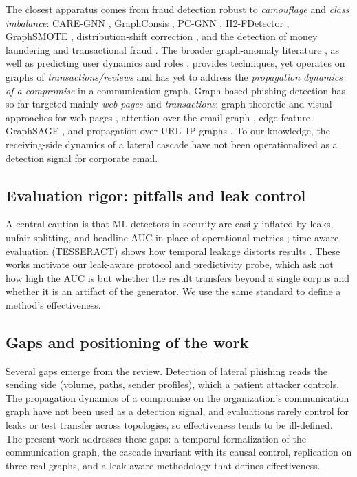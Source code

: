 The closest apparatus comes from fraud detection robust to
\emph{camouflage} and \emph{class imbalance}: CARE-GNN \citep{dou2020enhancing}, GraphConsis \citep{liu2020alleviating},
PC-GNN \citep{liu2021pick}, H2-FDetector \citep{shi2022h2fdetector}, GraphSMOTE \citep{zhao2021graphsmote},
distribution-shift correction \citep{gao2023alleviating,tang2022rethinking}, and the detection of money laundering
and transactional fraud \citep{weber2019antimoney,li2022ttagn,rayana2015collective}. The broader graph-anomaly
literature \citep{ding2019deep,park2020unsupervised,liu2021anomaly,ma2021comprehensive,zhang2021mcgc,li2025umgad}, as well as predicting user dynamics and roles
\citep{kumar2019predicting,wu2020who,li2022pdgnn}, provides techniques, yet operates on graphs of
\emph{transactions/reviews} and has yet to address the \emph{propagation dynamics of a compromise} in a
communication graph. Graph-based phishing detection has so far
targeted mainly \emph{web pages} and \emph{transactions}: graph-theoretic and visual approaches for web pages
\citep{tan2020graph,lin2021phishpedia,abdelnabi2020visualphishnet}, attention over the email graph
\citep{safran2025phishinggnn}, edge-feature GraphSAGE \citep{lo2021egraphsage}, and propagation over URL--IP graphs
\citep{guo2025efficient,li2022pdgnn}. To our knowledge, the receiving-side dynamics of a lateral cascade have
not been operationalized as a detection signal for corporate email.

\subsection{Evaluation rigor: pitfalls and leak control}
\label{sec:rw-eval}
A central caution is that ML detectors in security are easily inflated by leaks, unfair splitting, and headline
AUC in place of operational metrics \citep{arp2022dos}; time-aware evaluation (TESSERACT) shows how temporal
leakage distorts results \citep{pendlebury2019tesseract}. These works motivate our leak-aware protocol and
predictivity probe, which ask not how high the AUC is but whether the result transfers beyond a single corpus and
whether it is an artifact of the generator. We use the same standard to define a method's effectiveness.

\subsection{Gaps and positioning of the work}
\label{sec:rw-gap}
Several gaps emerge from the review. Detection of lateral phishing reads the sending side (volume, paths,
sender profiles), which a patient attacker controls. The propagation dynamics of a compromise on the
organization's communication graph have not been used as a detection signal, and evaluations rarely control for
leaks or test transfer across topologies, so effectiveness tends to be ill-defined. The present work addresses
these gaps: a temporal formalization of the communication graph, the cascade invariant with its causal control,
replication on three real graphs, and a leak-aware methodology that defines effectiveness.
